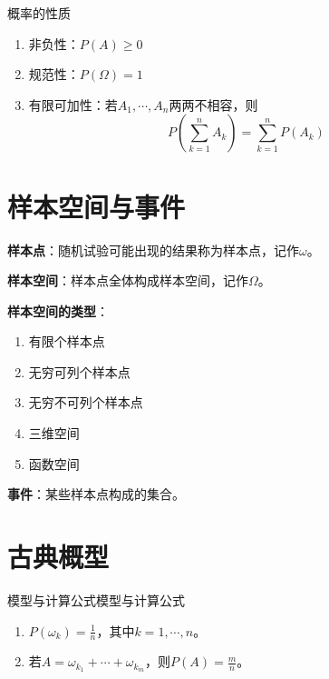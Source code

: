 \documentclass[lang = cn, scheme = chinese, thmcnt = section]{elegantbook}
\begin{document}
\begin{proposition}{概率的性质}
	\begin{enumerate}
		\item 非负性：$P(A)\ge 0$
		\item 规范性：$P(\Omega)=1$
		\item 有限可加性：若$A_1,\cdots,A_n$两两不相容，则
		$$
		P\left(\sum_{k=1}^{n}{A_k}\right)=\sum_{k=1}^{n}{P(A_k)}
		$$
	\end{enumerate}
\end{proposition}

\section{样本空间与事件}

\textbf{样本点}：随机试验可能出现的结果称为样本点，记作$\omega$。

\textbf{样本空间}：样本点全体构成样本空间，记作$\Omega$。

\textbf{样本空间的类型}：

\begin{enumerate}
	\item 有限个样本点
	\item 无穷可列个样本点
	\item 无穷不可列个样本点
	\item 三维空间
	\item 函数空间
\end{enumerate}

\textbf{事件}：某些样本点构成的集合。

\section{古典概型}

\begin{proposition}{模型与计算公式}{模型与计算公式}
	\begin{enumerate}
		\item $P(\omega_k)=\frac{1}{n}$，其中$k=1,\cdots,n$。
		\item 若$A=\omega_{k_1}+\cdots+\omega_{k_m}$，则$P(A)=\frac{m}{n}$。
	\end{enumerate}
\end{proposition}
\end{document}

